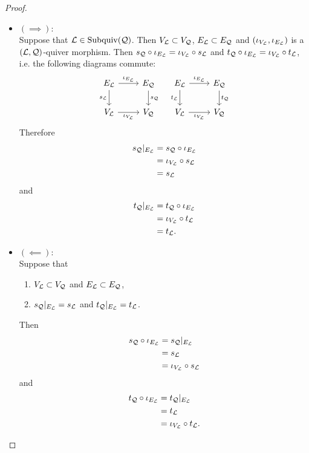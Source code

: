 \documentclass{book}
\begin{document}
	\begin{proof}\
		\begin{itemize}
			\item $(\implies)$: \\
			Suppose that $\mathcal{L} \in \operatorname{Subquiv}(\mathcal{Q})$. Then $V_{\mathcal{L}} \subset V_{\mathcal{Q}}$, $E_{\mathcal{L}} \subset E_{\mathcal{Q}}$ and $(\iota_{V_{\mathcal{L}}}, \iota_{E_{\mathcal{L}}})$ is a $(\mathcal{L}, \mathcal{Q})$-quiver morphism. Then $s_{\mathcal{Q}} \circ \iota_{E_{\mathcal{L}}} = \iota_{V_{\mathcal{L}}} \circ s_{\mathcal{L}}$ and $t_{\mathcal{Q}} \circ \iota_{E_{\mathcal{L}}} = \iota_{V_{\mathcal{L}}} \circ t_{\mathcal{L}}$, i.e. the following diagrams commute:
			\[ 
			\begin{tikzcd}
				E_{\ML} \arrow[r, "\iota_{E_{\ML}}"] \arrow[d, "s_{\ML}"'] & E_{\MQ}  \arrow[d, "s_{\MQ}"] \\
				V_{\ML} \arrow[r, "\iota_{V_{\ML}}"']                 & V_{\MQ}
			\end{tikzcd}
			\quad 
			\begin{tikzcd}
				E_{\ML} \arrow[r, "\iota_{E_{\ML}}"] \arrow[d, "t_{\ML}"'] & E_{\MQ}  \arrow[d, "t_{\MQ}"] \\
				V_{\ML} \arrow[r, "\iota_{V_{\ML}}"']                 & V_{\MQ}
			\end{tikzcd}
			\]
			Therefore
			\begin{align*}
				s_{\mathcal{Q}}|_{E_{\mathcal{L}}}
				& = s_{\mathcal{Q}} \circ \iota_{E_{\mathcal{L}}} \\
				& = \iota_{V_{\mathcal{L}}} \circ s_{\mathcal{L}} \\
				& = s_{\mathcal{L}}
			\end{align*}
			and 
			\begin{align*}
				t_{\mathcal{Q}}|_{E_{\mathcal{L}}}
				& = t_{\mathcal{Q}} \circ \iota_{E_{\mathcal{L}}} \\
				& = \iota_{V_{\mathcal{L}}} \circ t_{\mathcal{L}} \\
				& = t_{\mathcal{L}}.
			\end{align*}
			\item $(\impliedby)$: \\
			Suppose that 
			\begin{enumerate}
				\item $V_{\mathcal{L}} \subset V_{\mathcal{Q}}$ and $E_{\mathcal{L}} \subset E_{\mathcal{Q}}$,
				\item $s_{\mathcal{Q}}|_{E_{\mathcal{L}}} = s_{\mathcal{L}}$ and $t_{\mathcal{Q}}|_{E_{\mathcal{L}}} = t_{\mathcal{L}}$.
			\end{enumerate} 
			Then 
			\begin{align*}
				s_{\mathcal{Q}} \circ \iota_{E_{\mathcal{L}}} 
				& = s_{\mathcal{Q}}|_{E_{\mathcal{L}}} \\
				& = s_{\mathcal{L}} \\
				& = \iota_{V_{\mathcal{L}}} \circ s_{\mathcal{L}}
			\end{align*}
			and 
			\begin{align*}
				t_{\mathcal{Q}} \circ \iota_{E_{\mathcal{L}}} 
				& = t_{\mathcal{Q}}|_{E_{\mathcal{L}}} \\
				& = t_{\mathcal{L}} \\
				& = \iota_{V_{\mathcal{L}}} \circ t_{\mathcal{L}}.
			\end{align*}
		\end{itemize}
	\end{proof}
	
\end{document}
